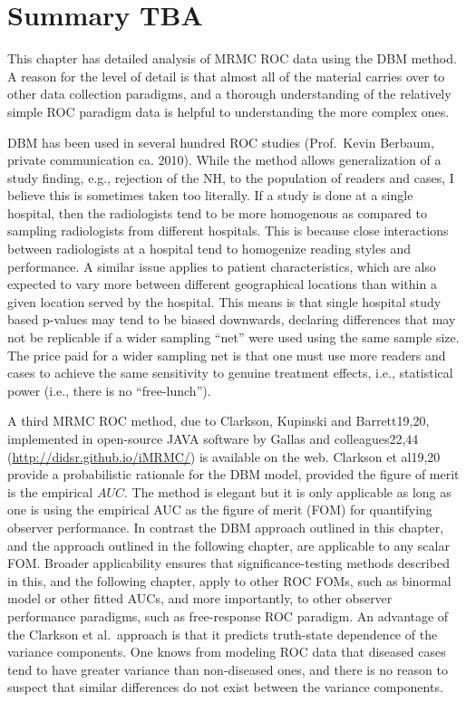 \documentclass[
]{book}
\begin{document}
\hypertarget{dbm-analysis-background-summary}{%
\section{Summary TBA}\label{dbm-analysis-background-summary}}

This chapter has detailed analysis of MRMC ROC data using the DBM method. A reason for the level of detail is that almost all of the material carries over to other data collection paradigms, and a thorough understanding of the relatively simple ROC paradigm data is helpful to understanding the more complex ones.

DBM has been used in several hundred ROC studies (Prof.~Kevin Berbaum, private communication ca. 2010). While the method allows generalization of a study finding, e.g., rejection of the NH, to the population of readers and cases, I believe this is sometimes taken too literally. If a study is done at a single hospital, then the radiologists tend to be more homogenous as compared to sampling radiologists from different hospitals. This is because close interactions between radiologists at a hospital tend to homogenize reading styles and performance. A similar issue applies to patient characteristics, which are also expected to vary more between different geographical locations than within a given location served by the hospital. This means is that single hospital study based p-values may tend to be biased downwards, declaring differences that may not be replicable if a wider sampling ``net'' were used using the same sample size. The price paid for a wider sampling net is that one must use more readers and cases to achieve the same sensitivity to genuine treatment effects, i.e., statistical power (i.e., there is no ``free-lunch'').

A third MRMC ROC method, due to Clarkson, Kupinski and Barrett19,20, implemented in open-source JAVA software by Gallas and colleagues22,44 (\url{http://didsr.github.io/iMRMC/}) is available on the web. Clarkson et al19,20 provide a probabilistic rationale for the DBM model, provided the figure of merit is the empirical \(AUC\). The method is elegant but it is only applicable as long as one is using the empirical AUC as the figure of merit (FOM) for quantifying observer performance. In contrast the DBM approach outlined in this chapter, and the approach outlined in the following chapter, are applicable to any scalar FOM. Broader applicability ensures that significance-testing methods described in this, and the following chapter, apply to other ROC FOMs, such as binormal model or other fitted AUCs, and more importantly, to other observer performance paradigms, such as free-response ROC paradigm. An advantage of the Clarkson et al.~approach is that it predicts truth-state dependence of the variance components. One knows from modeling ROC data that diseased cases tend to have greater variance than non-diseased ones, and there is no reason to suspect that similar differences do not exist between the variance components.
\end{document}
